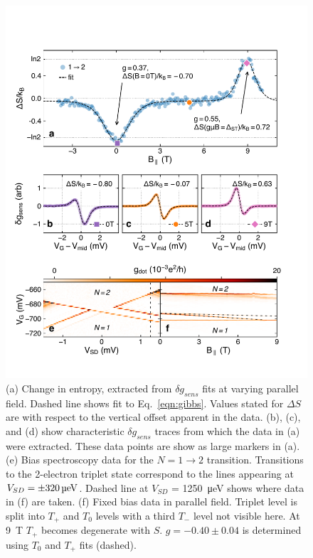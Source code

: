\documentclass[twocolumn,showpacs,amsmath,amssymb,prl,aps,superscriptaddress]{revtex4-1}
\begin{document}
\begin{figure}
        \includegraphics[width=1.0\columnwidth]{../figures/figure_4.pdf}
        \caption{\label{fig:fig4}(a) Change in entropy, extracted from $\delta g_{sens}$ fits at varying parallel field. Dashed line shows fit to Eq.~\ref{eqn:gibbs}. Values stated for $\Delta S$ are with respect to the vertical offset apparent in the data. (b), (c), and (d) show characteristic $\delta g_{sens}$ traces from which the data in (a) were extracted. These data points are show as large markers in (a). (e) Bias spectroscopy data for the $N=1 \rightarrow 2$ transition. Transitions to the 2-electron triplet state correspond to the lines appearing at $V_{SD} = \SI{\pm 320}{\micro\electronvolt}$. Dashed line at $V_{SD}$ = \SI{1250}{\micro\electronvolt} shows where data in (f) are taken. (f) Fixed bias data in parallel field. Triplet level is split into $T_+$ and $T_0$ levels with a third $T_{-}$ level not visible here. At \SI[input-protect-tokens]{9}{\tesla} $T_+$ becomes degenerate with $S$. $g=-0.40\pm0.04$ is determined using $T_0$ and $T_+$ fits (dashed).}
\end{figure}
\end{document}
